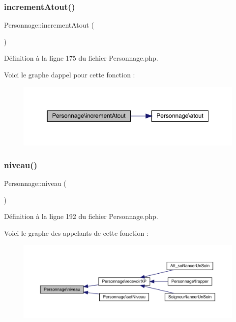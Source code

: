 \subsubsection{\texorpdfstring{increment\+Atout()}{incrementAtout()}}
{\footnotesize\ttfamily Personnage\+::increment\+Atout (\begin{DoxyParamCaption}{ }\end{DoxyParamCaption})}



Définition à la ligne 175 du fichier Personnage.\+php.

Voici le graphe d\textquotesingle{}appel pour cette fonction \+:\nopagebreak
\begin{figure}[H]
\begin{center}
\leavevmode
\includegraphics[width=350pt]{class_personnage_a744674b144008a43e37036344accb378_cgraph}
\end{center}
\end{figure}
\mbox{\label{class_personnage_a061130b0c1c551d893ecffff2553cb93}} 
\subsubsection{\texorpdfstring{niveau()}{niveau()}}
{\footnotesize\ttfamily Personnage\+::niveau (\begin{DoxyParamCaption}{ }\end{DoxyParamCaption})}



Définition à la ligne 192 du fichier Personnage.\+php.

Voici le graphe des appelants de cette fonction \+:\nopagebreak
\begin{figure}[H]
\begin{center}
\leavevmode
\includegraphics[width=350pt]{class_personnage_a061130b0c1c551d893ecffff2553cb93_icgraph}
\end{center}
\end{figure}
\mbox{\label{class_personnage_a236eb0f89c6676425ddfcc25967a527a}} 
